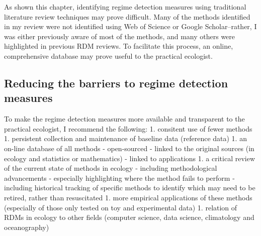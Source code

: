 \documentclass[12pt,twoside,openany]{reedthesis}
\begin{document}
As shown this chapter, identifying regime detection measures using
traditional literature review techniques may prove difficult. Many of
the methods identified in my review were not identified using Web of
Science or Google Scholar--rather, I was either previously aware of most
of the methods, and many others were highlighted in previous RDM
reviews. To facilitate this process, an online, comprehensive database
may prove useful to the practical ecologist.

\subsection{Reducing the barriers to regime detection
measures}\label{reducing-the-barriers-to-regime-detection-measures}

To make the regime detection measures more available and transparent to
the practical ecologist, I recommend the following: 1. consitent use of
fewer methods 1. persistent collection and maintenance of baseline data
(reference data) 1. an on-line database of all methods - open-sourced -
linked to the original sources (in ecology and statistics or
mathematics) - linked to applications 1. a critical review of the
current state of methods in ecology - including methodological
advancements - especially highlighting where the method fails to perform
- including historical tracking of specific methods to identify which
may need to be retired, rather than resuscitated 1. more empirical
applications of these methods (especially of those only tested on toy
and experimental data) 1. relation of RDMs in ecology to other fields
(computer science, data science, climatology and oceanography)
\end{document}
